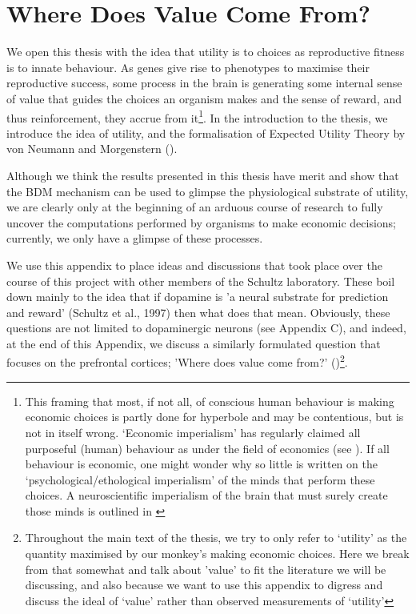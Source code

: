 \chapter{Where Does Value Come From?} 

\ifpdf
    \graphicspath{{Appendix1.2/Figs/Raster/}{Appendix1.2/Figs/PDF/}{Appendix1.2/Figs/}}
\else
    \graphicspath{{Appendix1.2/Figs/Vector/}{Appendix1.2/Figs/}}
\fi

We open this thesis with the idea that utility is to choices as reproductive fitness is to innate behaviour. As genes give rise to phenotypes to maximise their reproductive success, some process in the brain is generating some internal sense of value that guides the choices an organism makes and the sense of reward, and thus reinforcement, they accrue from it\footnote{This framing that most, if not all, of conscious human behaviour is making economic choices is partly done for hyperbole and may be contentious, but is not in itself wrong. ‘Economic imperialism’ has regularly claimed all purposeful (human) behaviour as under the field of economics (see \cite{stiglerEconomicsImperialScience1984}). If all behaviour is economic, one might wonder why so little is written on the ‘psychological/ethological imperialism’ of the minds that perform these choices. A neuroscientific imperialism of the brain that must surely create those minds is outlined in \cite{bujoldAdaptiveEconomicsNeuroethological2019}}. In the introduction to the thesis, we introduce the idea of utility, and the formalisation of Expected Utility Theory by von Neumann and Morgenstern (\cite{vonNeumann1944}).

Although we think the results presented in this thesis have merit and show that the BDM mechanism can be used to glimpse the physiological substrate of utility, we are clearly only at the beginning of an arduous course of research to fully uncover the computations performed by organisms to make economic decisions; currently, we only have a glimpse of these processes.

We use this appendix to place ideas and discussions that took place over the course of this project with other members of the Schultz laboratory. These boil down mainly to the idea that if dopamine is 'a neural substrate for prediction and reward' (Schultz et al., 1997) then what does that mean. Obviously, these questions are not limited to dopaminergic neurons (see Appendix C), and indeed, at the end of this Appendix, we discuss a similarly formulated question that focuses on the prefrontal cortices; 'Where does value come from?’ (\cite{juechemsWhereDoesValue2019})\footnote{Throughout the main text of the thesis, we try to only refer to ‘utility’ as the quantity maximised by our monkey’s making economic choices. Here we break from that somewhat and talk about 'value' to fit the literature we will be discussing, and also because we want to use this appendix to digress and discuss the ideal of ‘value’ rather than observed measurements of ‘utility’}.

